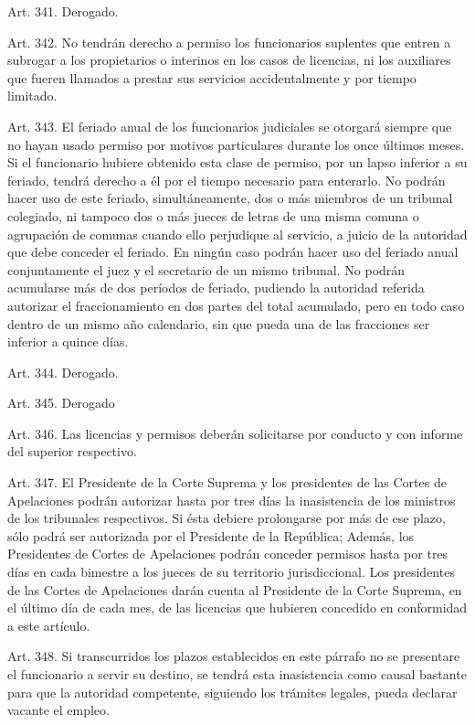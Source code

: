     Art. 341. Derogado.

    Art. 342. No tendrán derecho a permiso los funcionarios suplentes que entren a subrogar a los propietarios o interinos en los casos de licencias, ni los auxiliares que fueren llamados a prestar sus servicios accidentalmente y por tiempo limitado.



    Art. 343. El feriado anual de los funcionarios judiciales se otorgará siempre que no hayan usado permiso por motivos particulares durante los once últimos meses. Si el funcionario hubiere obtenido esta clase de permiso, por un lapso inferior a su feriado, tendrá derecho a él por el tiempo necesario para enterarlo.
    No podrán hacer uso de este feriado, simultáneamente, dos o más miembros de un tribunal colegiado, ni tampoco dos o más jueces de letras de una misma comuna o agrupación de comunas cuando ello perjudique al servicio, a juicio de la autoridad que debe conceder el feriado. En ningún caso podrán hacer uso del feriado anual conjuntamente el juez y el secretario de un mismo tribunal.
    No podrán acumularse más de dos períodos de feriado, pudiendo la autoridad referida autorizar el fraccionamiento en dos partes del total acumulado, pero en todo caso dentro de un mismo año calendario, sin que pueda una de las fracciones ser inferior a quince días.

    Art. 344. Derogado.

    Art. 345. Derogado


    Art. 346. Las licencias y permisos deberán solicitarse por conducto y con informe del superior respectivo.


    Art. 347. El Presidente de la Corte Suprema y los presidentes de las Cortes de Apelaciones podrán autorizar hasta por tres días la inasistencia de los ministros de los tribunales respectivos. Si ésta debiere prolongarse por más de ese plazo, sólo podrá ser autorizada por el Presidente de la República;
    Además, los Presidentes de Cortes de Apelaciones podrán conceder permisos hasta por tres días en cada bimestre a los jueces de su territorio jurisdiccional.
    Los presidentes de las Cortes de Apelaciones darán cuenta al Presidente de la Corte Suprema, en el último día de cada mes, de las licencias que hubieren concedido en conformidad a este artículo.


    Art. 348. Si transcurridos los plazos establecidos en este párrafo no se presentare el funcionario a servir su destino, se tendrá esta inasistencia como causal bastante para que la autoridad competente, siguiendo los trámites legales, pueda declarar vacante el empleo.

